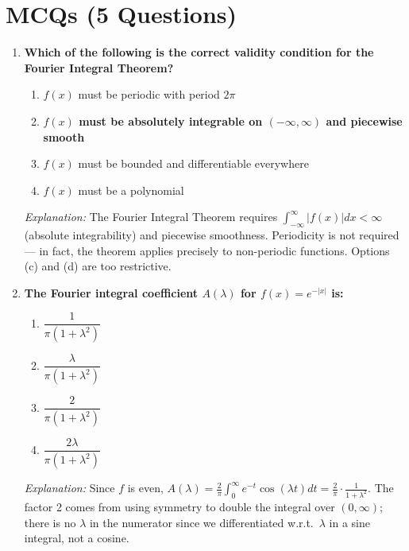 \documentclass[12pt,a4paper]{article}
\begin{document}
\section{MCQs (5 Questions)}

\begin{enumerate}[label=\textbf{MCQ \arabic*.}]

\item \textbf{Which of the following is the correct validity condition for the Fourier Integral Theorem?}
\begin{enumerate}[label=(\alph*)]
  \item $f(x)$ must be periodic with period $2\pi$
  \item \textbf{$f(x)$ must be absolutely integrable on $(-\infty,\infty)$ and piecewise smooth}
  \item $f(x)$ must be bounded and differentiable everywhere
  \item $f(x)$ must be a polynomial
\end{enumerate}
\textit{Explanation:} The Fourier Integral Theorem requires $\int_{-\infty}^\infty|f(x)|dx<\infty$ (absolute integrability) and piecewise smoothness. Periodicity is not required --- in fact, the theorem applies precisely to non-periodic functions. Options (c) and (d) are too restrictive.

\item \textbf{The Fourier integral coefficient $A(\lambda)$ for $f(x)=e^{-|x|}$ is:}
\begin{enumerate}[label=(\alph*)]
  \item $\dfrac{1}{\pi(1+\lambda^2)}$
  \item $\dfrac{\lambda}{\pi(1+\lambda^2)}$
  \item \textbf{$\dfrac{2}{\pi(1+\lambda^2)}$}
  \item $\dfrac{2\lambda}{\pi(1+\lambda^2)}$
\end{enumerate}
\textit{Explanation:} Since $f$ is even, $A(\lambda)=\frac{2}{\pi}\int_0^\infty e^{-t}\cos(\lambda t)dt=\frac{2}{\pi}\cdot\frac{1}{1+\lambda^2}$. The factor 2 comes from using symmetry to double the integral over $(0,\infty)$; there is no $\lambda$ in the numerator since we differentiated w.r.t.\ $\lambda$ in a sine integral, not a cosine.


\end{enumerate}
\end{document}

